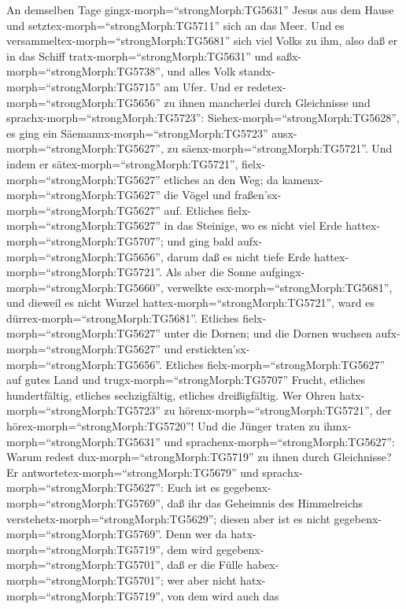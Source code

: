  An demselben Tage gingx-morph=``strongMorph:TG5631'' Jesus
aus dem Hause und setztex-morph=``strongMorph:TG5711'' sich an das Meer.
 Und es versammeltex-morph=``strongMorph:TG5681'' sich viel
Volks zu ihm, also daß er in das Schiff
tratx-morph=``strongMorph:TG5631'' und
saßx-morph=``strongMorph:TG5738'', und alles Volk
standx-morph=``strongMorph:TG5715'' am Ufer.  Und er
redetex-morph=``strongMorph:TG5656'' zu ihnen mancherlei durch
Gleichnisse und sprachx-morph=``strongMorph:TG5723'':
Siehex-morph=``strongMorph:TG5628'', es ging ein
Säemannx-morph=``strongMorph:TG5723'' ausx-morph=``strongMorph:TG5627'',
zu säenx-morph=``strongMorph:TG5721''.  Und indem er
sätex-morph=``strongMorph:TG5721'', fielx-morph=``strongMorph:TG5627''
etliches an den Weg; da kamenx-morph=``strongMorph:TG5627'' die Vögel
und fraßen'sx-morph=``strongMorph:TG5627'' auf.  Etliches
fielx-morph=``strongMorph:TG5627'' in das Steinige, wo es nicht viel
Erde hattex-morph=``strongMorph:TG5707''; und ging bald
aufx-morph=``strongMorph:TG5656'', darum daß es nicht tiefe Erde
hattex-morph=``strongMorph:TG5721''.  Als aber die Sonne
aufgingx-morph=``strongMorph:TG5660'', verwelkte
esx-morph=``strongMorph:TG5681'', und dieweil es nicht Wurzel
hattex-morph=``strongMorph:TG5721'', ward es
dürrex-morph=``strongMorph:TG5681''.  Etliches
fielx-morph=``strongMorph:TG5627'' unter die Dornen; und die Dornen
wuchsen aufx-morph=``strongMorph:TG5627'' und
erstickten'sx-morph=``strongMorph:TG5656''.  Etliches
fielx-morph=``strongMorph:TG5627'' auf gutes Land und
trugx-morph=``strongMorph:TG5707'' Frucht, etliches hundertfältig,
etliches sechzigfältig, etliches dreißigfältig.  Wer Ohren
hatx-morph=``strongMorph:TG5723'' zu
hörenx-morph=``strongMorph:TG5721'', der
hörex-morph=``strongMorph:TG5720''!  Und die Jünger traten
zu ihmx-morph=``strongMorph:TG5631'' und
sprachenx-morph=``strongMorph:TG5627'': Warum redest
dux-morph=``strongMorph:TG5719'' zu ihnen durch Gleichnisse?
 Er antwortetex-morph=``strongMorph:TG5679'' und
sprachx-morph=``strongMorph:TG5627'': Euch ist es
gegebenx-morph=``strongMorph:TG5769'', daß ihr das Geheimnis des
Himmelreichs verstehetx-morph=``strongMorph:TG5629''; diesen aber ist es
nicht gegebenx-morph=``strongMorph:TG5769''.  Denn wer da
hatx-morph=``strongMorph:TG5719'', dem wird
gegebenx-morph=``strongMorph:TG5701'', daß er die Fülle
habex-morph=``strongMorph:TG5701''; wer aber nicht
hatx-morph=``strongMorph:TG5719'', von dem wird auch das
